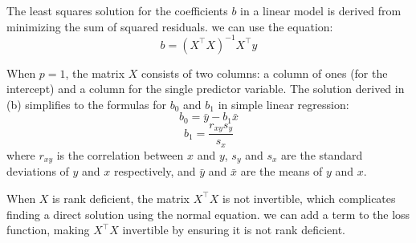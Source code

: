 \documentclass[12pt]{article}
\begin{document}

\begin{enumerate}



The least squares solution for the coefficients \(b\) in a linear model is derived from minimizing the sum of squared residuals. we can use the equation:
\[
b = (X^\top X)^{-1}X^\top y
\]



 

When \(p = 1\), the matrix \(X\) consists of two columns: a column of ones (for the intercept) and a column for the single predictor variable. The solution derived in (b) simplifies to the formulas for \(b_0\) and \(b_1\) in simple linear regression:
\[
b_0 = \bar{y} - b_1\bar{x}
\]
\[
b_1 = \frac{r_{xy} s_y}{s_x}
\]
where \(r_{xy}\) is the correlation between \(x\) and \(y\), \(s_y\) and \(s_x\) are the standard deviations of \(y\) and \(x\) respectively, and \(\bar{y}\) and \(\bar{x}\) are the means of \(y\) and \(x\).


 

When \(X\) is rank deficient, the matrix \(X^\top X\) is not invertible, which complicates finding a direct solution using the normal equation. we can add a term to the loss function, making \(X^\top X\) invertible by ensuring it is not rank deficient.






\end{enumerate}
\end{document}
